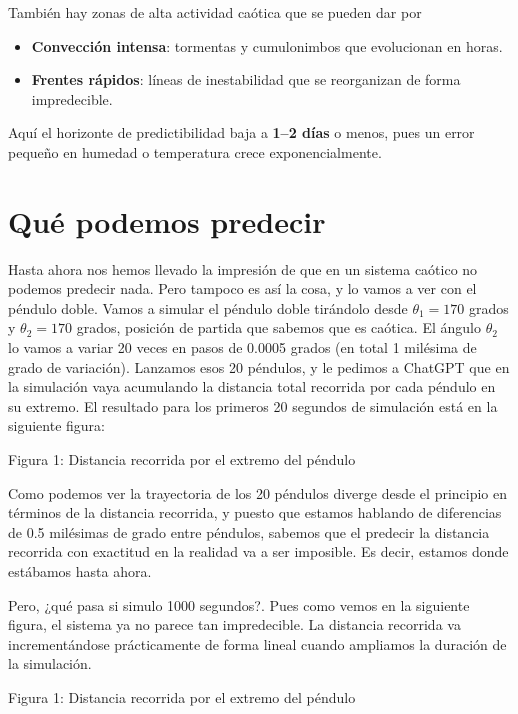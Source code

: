 \documentclass[
  10pt,
  a4paper,
  DIV=11,
  numbers=noendperiod,
  open=any]{scrreprt}
\providecommand{\tightlist}{%
  \setlength{\itemsep}{0pt}\setlength{\parskip}{0pt}}
\numberwithin{equation}{chapter}
\numberwithin{equation}{chapter}
\renewcommand{\[}{\begin{equation}}
\renewcommand{\]}{\end{equation}}
\begin{document}
También hay zonas de alta actividad caótica que se pueden dar por

\begin{itemize}
\tightlist
\item
  \textbf{Convección intensa}: tormentas y cumulonimbos que evolucionan
  en horas.
\item
  \textbf{Frentes rápidos}: líneas de inestabilidad que se reorganizan
  de forma impredecible.
\end{itemize}

Aquí el horizonte de predictibilidad baja a \textbf{1--2 días} o menos,
pues un error pequeño en humedad o temperatura crece exponencialmente.


\chapter{Qué podemos predecir}\label{quuxe9-podemos-predecir}

Hasta ahora nos hemos llevado la impresión de que en un sistema caótico
no podemos predecir nada. Pero tampoco es así la cosa, y lo vamos a ver
con el péndulo doble. Vamos a simular el péndulo doble tirándolo desde
\(\theta_1=170\) grados y \(\theta_2=170\) grados, posición de partida
que sabemos que es caótica. El ángulo \(\theta_2\) lo vamos a variar 20
veces en pasos de 0.0005 grados (en total 1 milésima de grado de
variación). Lanzamos esos 20 péndulos, y le pedimos a ChatGPT que en la
simulación vaya acumulando la distancia total recorrida por cada péndulo
en su extremo. El resultado para los primeros 20 segundos de simulación
está en la siguiente figura:

Figura 1: Distancia recorrida por el extremo del péndulo

Como podemos ver la trayectoria de los 20 péndulos diverge desde el
principio en términos de la distancia recorrida, y puesto que estamos
hablando de diferencias de 0.5 milésimas de grado entre péndulos,
sabemos que el predecir la distancia recorrida con exactitud en la
realidad va a ser imposible. Es decir, estamos donde estábamos hasta
ahora.

Pero, ¿qué pasa si simulo 1000 segundos?. Pues como vemos en la
siguiente figura, el sistema ya no parece tan impredecible. La distancia
recorrida va incrementándose prácticamente de forma lineal cuando
ampliamos la duración de la simulación.

Figura 1: Distancia recorrida por el extremo del péndulo
\end{document}

